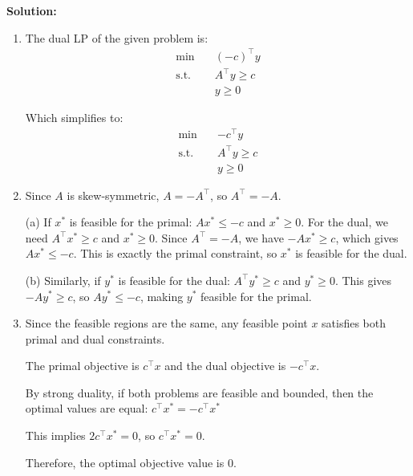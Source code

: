 \documentclass[11pt]{article}
\begin{document}
\begin{enumerate}
    \textbf{Solution:}
    
    \begin{enumerate}
        \item The dual LP of the given problem is:
              \begin{align*}
              \min \quad & (-c)^\top y \\
              \text{s.t.}\quad & A^\top y \ge c \\
              & y \ge 0
              \end{align*}
              
              Which simplifies to:
              \begin{align*}
              \min \quad & -c^\top y \\
              \text{s.t.}\quad & A^\top y \ge c \\
              & y \ge 0
              \end{align*}

        \item Since $A$ is skew-symmetric, $A = -A^\top$, so $A^\top = -A$.
              
              (a) If $x^*$ is feasible for the primal: $Ax^* \le -c$ and $x^* \ge 0$.
              For the dual, we need $A^\top x^* \ge c$ and $x^* \ge 0$.
              Since $A^\top = -A$, we have $-Ax^* \ge c$, which gives $Ax^* \le -c$. This is exactly the primal constraint, so $x^*$ is feasible for the dual.
              
              (b) Similarly, if $y^*$ is feasible for the dual: $A^\top y^* \ge c$ and $y^* \ge 0$.
              This gives $-Ay^* \ge c$, so $Ay^* \le -c$, making $y^*$ feasible for the primal.

        \item Since the feasible regions are the same, any feasible point $x$ satisfies both primal and dual constraints.
              
              The primal objective is $c^\top x$ and the dual objective is $-c^\top x$.
              
              By strong duality, if both problems are feasible and bounded, then the optimal values are equal:
              $c^\top x^* = -c^\top x^*$
              
              This implies $2c^\top x^* = 0$, so $c^\top x^* = 0$.
              
              Therefore, the optimal objective value is $0$.
    \end{enumerate}


\end{enumerate}
\end{document}
